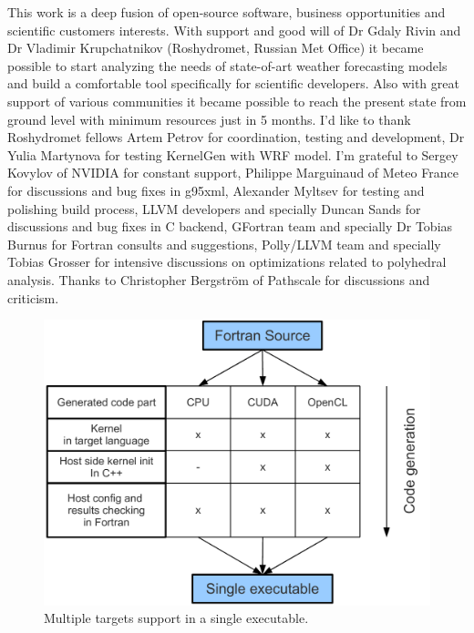 \documentclass[a4,12pt]{article}
\begin{document}
This work is a deep fusion of open-source software, business opportunities and scientific customers interests. With support and good will of Dr Gdaly Rivin and Dr Vladimir Krupchatnikov (Roshydromet, Russian Met Office) it became possible to start analyzing the needs of state-of-art weather forecasting models and build a comfortable tool specifically for scientific developers. Also with great support of various communities it became possible to reach the present state from ground level with minimum resources just in 5 months. I'd like to thank Roshydromet fellows Artem Petrov for coordination, testing and development, Dr Yulia Martynova for testing KernelGen with WRF model. I'm grateful to Sergey Kovylov of NVIDIA for constant support, Philippe Marguinaud of Meteo France for discussions and bug fixes in g95xml, Alexander Myltsev for testing and polishing build process, LLVM developers and specially Duncan Sands for discussions and bug fixes in C backend, GFortran team and specially Dr Tobias Burnus for Fortran consults and suggestions, Polly/LLVM team and specially Tobias Grosser for intensive discussions on optimizations related to polyhedral analysis. Thanks to Christopher Bergström of Pathscale for discussions and criticism.

\begin{figure}
\centering
\includegraphics[scale=0.5]{figures/portability.pdf}
\caption{Multiple targets support in a single executable.}
\label{fig:portability}
\end{figure}
\end{document}
